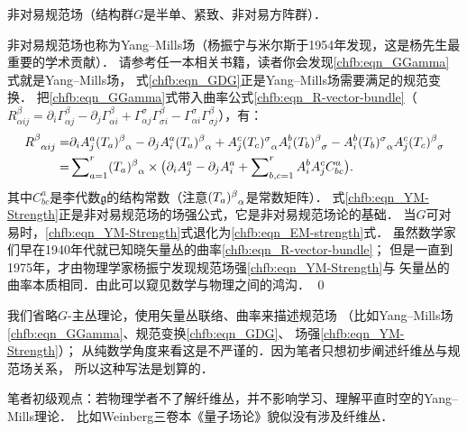 \begin{example}
	非对易规范场（结构群$G$是半单、紧致、非对易方阵群）．
\end{example}
非对易规范场也称为Yang--Mills场（杨振宁与米尔斯于1954年发现，这是杨先生最重要的学术贡献）．
请参考任一本相关书籍，读者你会发现\eqref{chfb:eqn_GGamma}式就是Yang--Mills场，
式\eqref{chfb:eqn_GDG}正是Yang--Mills场需要满足的规范变换．
把\eqref{chfb:eqn_GGamma}式带入曲率公式\eqref{chfb:eqn_R-vector-bundle}（$R_{\alpha i j}^\beta 
= {\partial_i} \Gamma_{\alpha j}^{\beta} -\partial_j \Gamma_{\alpha i}^{\beta}
+\Gamma_{\alpha j}^{\sigma} \Gamma_{\sigma i}^{\beta} 
-  \Gamma_{\alpha i}^{\sigma}\Gamma_{\sigma j}^{\beta}$），有：
\begin{align}
	R_{\hphantom{\alpha}\alpha i j}^\beta 
	=&{\partial_i} A^a_j (T_a)_{\hphantom{\alpha}\alpha}^\beta 
	-\partial_j A^a_i (T_a)_{\hphantom{\alpha}\alpha}^\beta 
	+A^c_j (T_c)_{\hphantom{\alpha}\alpha}^\sigma  A^b_i (T_b)_{\hphantom{\alpha}\sigma}^\beta
	-A^b_i (T_b)_{\hphantom{\alpha}\alpha}^\sigma  A^c_j (T_c)_{\hphantom{\alpha}\sigma}^\beta \notag\\
	=& \sum\nolimits_{a=1}^{r}(T_a)_{\hphantom{\alpha}\alpha}^\beta  \times \bigl(
	{\partial_i} A^a_j  -\partial_j A^a_i  + \sum\nolimits_{b,c=1}^{r} A^b_i A^c_j C_{bc}^a    \bigr) .
	\label{chfb:eqn_YM-Strength}
\end{align}
其中$C_{bc}^a$是李代数$\mathfrak{g}$的结构常数（注意$(T_a)_{\hphantom{\alpha}\alpha}^\beta $是常数矩阵）．
式\eqref{chfb:eqn_YM-Strength}正是非对易规范场的场强公式，它是非对易规范场论的基础．
当$G$可对易时，\eqref{chfb:eqn_YM-Strength}式退化为\eqref{chfb:eqn_EM-strength}式．
虽然数学家们早在1940年代就已知晓矢量丛的曲率\eqref{chfb:eqn_R-vector-bundle}；
但是一直到1975年，才由物理学家杨振宁发现规范场强\eqref{chfb:eqn_YM-Strength}与
矢量丛的曲率本质相同．由此可以窥见数学与物理之间的鸿沟．
\qed


\begin{remark}
	我们{\kaishu 省略$G$-主丛理论}，使用矢量丛联络、曲率来描述规范场
	（比如Yang--Mills场\eqref{chfb:eqn_GGamma}、规范变换\eqref{chfb:eqn_GDG}、
	场强\eqref{chfb:eqn_YM-Strength}）；
	从纯数学角度来看这是不严谨的．因为笔者只想初步阐述纤维丛与规范场关系，
	所以这种写法是划算的．
\end{remark}

\begin{remark}\label{chfb:rem_qft}
	笔者初级观点：若物理学者不了解纤维丛，并不影响学习、理解平直时空的Yang--Mills理论．
	比如Weinberg三卷本《量子场论》貌似没有涉及纤维丛．
\end{remark}









